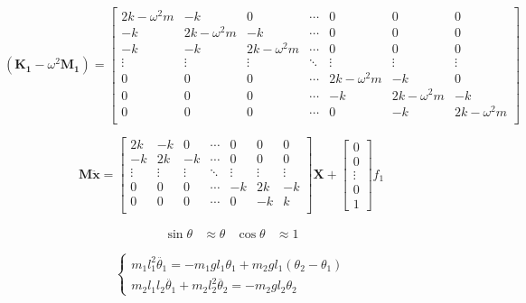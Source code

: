 \documentclass[12pt]{article}
\begin{document}
\begin{equation}
    \left( \mathbf{K_1} -\omega^2 \mathbf{M_1} \right) = 
    \begin{bmatrix}
        2k-\omega^2 m & -k & 0 & \cdots & 0 & 0 & 0\\
        -k & 2k-\omega^2 m & -k & \cdots & 0 & 0 & 0\\
        -k & -k & 2k-\omega^2 m & \cdots & 0 & 0 & 0\\
        \vdots & \vdots & \vdots & \ddots & \vdots & \vdots & \vdots \\
        0 & 0 & 0 & \cdots & 2k-\omega^2 m & -k & 0 \\
        0 & 0 & 0 & \cdots & -k & 2k-\omega^2 m & -k \\
        0 & 0 & 0 & \cdots & 0 & -k & 2k-\omega^2 m \\
    \end{bmatrix}
\end{equation}

\begin{equation}
    \mathbf{M} \ddot{\mathbf{x}} =
    \begin{bmatrix}
        2k & -k & 0 & \cdots & 0 & 0 & 0 \\
        -k & 2k & -k & \cdots & 0 & 0 & 0 \\
        \vdots & \vdots & \vdots & \ddots & \vdots & \vdots & \vdots \\
        0 & 0 & 0 & \cdots & -k & 2k & -k \\
        0 & 0 & 0 & \cdots & 0 & -k & k \\
    \end{bmatrix}
    \mathbf{X} +
    \begin{bmatrix}
        0 \\
        0 \\
        \vdots \\
        0 \\
        1
    \end{bmatrix} f_1
\end{equation}

\begin{align}
    \sin \theta &\approx \theta & \cos \theta &\approx 1
\end{align}

\begin{equation}
    \begin{cases}
        m_1 l_1^2 \ddot{\theta_1} = -m_1 g l_1 \theta_1 + m_2 g l_1 \left( \theta_2 - \theta_1  \right) \\
        m_2 l_1 l_2 \ddot{\theta_1} + m_2 l_2^2 \ddot{\theta_2} = -m_2 g l_2 \theta_2
    \end{cases}
\end{equation}
\end{document}
